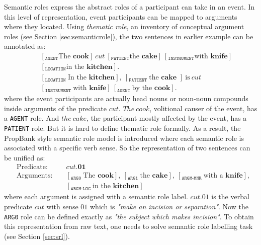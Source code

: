 \documentclass[a4paper]{article}
\begin{document}
Semantic roles express the abstract roles of a participant can take in an event. In this level of representation, event participants can be mapped to arguments where they located. Using \textit{thematic role}, an inventory of conceptual argument roles (see Section \ref{sec:semanticrole}), the two sentences in earlier example can be annotated as: 
\begin{eqnarray} \label{eg:thematic}
    \nonumber & &[_{\texttt{AGENT}} \text{The }\textbf{cook}]\ cut\ [_{\texttt{PATIENT}}\text{the }\textbf{cake}]\ [_{\texttt{INSTRUMENT}}\text{with }\textbf{knife}]\\  
    &   &[_{\texttt{LOCATION}}\text{in the }\textbf{kitchen}]. \\
    \nonumber & &[_{\texttt{LOCATION }}\text{In the }\textbf{kitchen}],\ [_{\texttt{PATIENT }}\text{the }\textbf{cake }]\ \text{is} \ cut\ \\
    &   &[_{\texttt{INSTRUMENT }}\text{with }\textbf{knife}]\ [_{\texttt{AGENT }}\text{by the }\textbf{cook}]. 
\end{eqnarray} 
where the event participants are actually head nouns or noun-noun compounds inside arguments of the predicate $cut$. $The\ cook$, volitional causer of the event, has a \texttt{AGENT} role. And $the\ cake$, the participant mostly affected by the event, has a \texttt{PATIENT} role. But it is hard to define thematic role formally. As a result, the PropBank \citep{palmer2005proposition} style semantic role model is introduced where each semantic role is associated with a specific verb sense. So the representation of two sentences can be unified as: 
\begin{equation*} \label{eg:probank}
\begin{aligned}
    & \text{Predicate: }&&cut.\textbf{01} \\
    & \text{Arguments: }&&[_{\texttt{ARG0 }}\text{The }\textbf{cook}], \ [_{\texttt{ARG1 }}\text{the }\textbf{cake}], \ [_{\texttt{ARGM-MNR }}\text{with a }\textbf{knife}], \\
    &                   &&[_{\texttt{ARGM-LOC }}\text{in the }\textbf{kitchen}]
\end{aligned}
\end{equation*} 
where each argument is assigned with a semantic role label. $cut.01$ is the verbal predicate $cut$ with sense $01$ which is \textit{"make an incision or separation"}. Now the \texttt{ARG0} role can be defined exactly as \textit{"the subject which makes incision"}. To obtain this representation from raw text, one needs to solve semantic role labelling task (see Section \ref{sec:srl}). 
\end{document}
